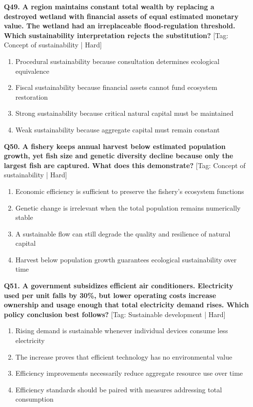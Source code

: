 \noindent\textbf{Q49. A region maintains constant total wealth by replacing a destroyed wetland with financial assets of equal estimated monetary value. The wetland had an irreplaceable flood-regulation threshold. Which sustainability interpretation rejects the substitution?} \hfill [Tag: Concept of sustainability | Hard]
\begin{enumerate}[label=(\alph*),topsep=2pt,itemsep=1pt,partopsep=0pt,parsep=0pt]
    \item {Procedural sustainability because consultation determines ecological equivalence}
    \item {Fiscal sustainability because financial assets cannot fund ecosystem restoration}
    \item {Strong sustainability because critical natural capital must be maintained}
    \item {Weak sustainability because aggregate capital must remain constant}
\end{enumerate}
\vspace{2mm}

\noindent\textbf{Q50. A fishery keeps annual harvest below estimated population growth, yet fish size and genetic diversity decline because only the largest fish are captured. What does this demonstrate?} \hfill [Tag: Concept of sustainability | Hard]
\begin{enumerate}[label=(\alph*),topsep=2pt,itemsep=1pt,partopsep=0pt,parsep=0pt]
    \item {Economic efficiency is sufficient to preserve the fishery's ecosystem functions}
    \item {Genetic change is irrelevant when the total population remains numerically stable}
    \item {A sustainable flow can still degrade the quality and resilience of natural capital}
    \item {Harvest below population growth guarantees ecological sustainability over time}
\end{enumerate}
\vspace{2mm}

\noindent\textbf{Q51. A government subsidizes efficient air conditioners. Electricity used per unit falls by 30\%, but lower operating costs increase ownership and usage enough that total electricity demand rises. Which policy conclusion best follows?} \hfill [Tag: Sustainable development | Hard]
\begin{enumerate}[label=(\alph*),topsep=2pt,itemsep=1pt,partopsep=0pt,parsep=0pt]
    \item {Rising demand is sustainable whenever individual devices consume less electricity}
    \item {The increase proves that efficient technology has no environmental value}
    \item {Efficiency improvements necessarily reduce aggregate resource use over time}
    \item {Efficiency standards should be paired with measures addressing total consumption}
\end{enumerate}
\vspace{2mm}

